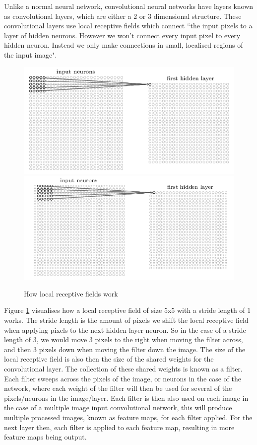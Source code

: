 \documentclass[10pt]{article}
\begin{document}
		 Unlike a normal neural network, convolutional neural networks have layers known as convolutional layers, which are either a 2 or 3 dimensional structure. These convolutional layers use local receptive fields which connect ``the input pixels to a layer of hidden neurons. However we won't connect every input pixel to every hidden neuron. Instead we only make connections in small, localised regions of the input image"\cite{nndl}.\\
		 
		\begin{figure}[h]				
			\includegraphics[scale=0.55]{img/convNet1}
			\includegraphics[scale=0.55]{img/convNet2}
			\centering
			\caption{How local receptive fields work \cite{nndl}}
			\label{fig:lrf}
		\end{figure}
		Figure \ref{fig:lrf} visualises how a local receptive field of size 5x5 with a stride length of 1 works. The stride length is the amount of pixels we shift the local receptive field when applying pixels to the next hidden layer neuron. So in the case of a stride length of 3, we would move 3 pixels to the right when moving the filter across, and then 3 pixels down when moving the filter down the image. The size of the local receptive field is also then the size of the shared weights for the convolutional layer. The collection of these shared weights is known as a filter. Each filter sweeps across the pixels of the image, or neurons in the case of the network, where each weight of the filter will then be used for several of the pixels/neurons in the image/layer. Each filter is then also used on each image in the case of a multiple image input convolutional network, this will produce multiple processed images, known as feature maps, for each filter applied. For the next layer then, each filter is applied to each feature map, resulting in more feature maps being output.\\
		
\end{document}

